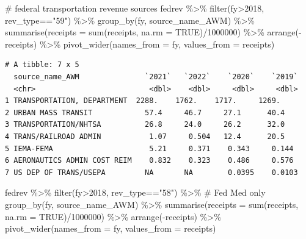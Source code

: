 \documentclass[
  letterpaper,
  DIV=11,
  numbers=noendperiod]{scrreport}
\newenvironment{Shaded}{\begin{snugshade}}{\end{snugshade}}
\newcommand{\AttributeTok}[1]{\textcolor[rgb]{0.40,0.45,0.13}{#1}}
\newcommand{\CommentTok}[1]{\textcolor[rgb]{0.37,0.37,0.37}{#1}}
\newcommand{\ConstantTok}[1]{\textcolor[rgb]{0.56,0.35,0.01}{#1}}
\newcommand{\DecValTok}[1]{\textcolor[rgb]{0.68,0.00,0.00}{#1}}
\newcommand{\FunctionTok}[1]{\textcolor[rgb]{0.28,0.35,0.67}{#1}}
\newcommand{\NormalTok}[1]{\textcolor[rgb]{0.00,0.23,0.31}{#1}}
\newcommand{\SpecialCharTok}[1]{\textcolor[rgb]{0.37,0.37,0.37}{#1}}
\newcommand{\StringTok}[1]{\textcolor[rgb]{0.13,0.47,0.30}{#1}}
\begin{document}
\begin{Shaded}
\begin{Highlighting}[]
\CommentTok{\# federal transportation revenue sources}
\NormalTok{fedrev }\SpecialCharTok{\%\textgreater{}\%} 
  \FunctionTok{filter}\NormalTok{(fy}\SpecialCharTok{\textgreater{}}\DecValTok{2018}\NormalTok{, rev\_type}\SpecialCharTok{==}\StringTok{"59"}\NormalTok{) }\SpecialCharTok{\%\textgreater{}\%}
  \FunctionTok{group\_by}\NormalTok{(fy, source\_name\_AWM) }\SpecialCharTok{\%\textgreater{}\%} 
  \FunctionTok{summarise}\NormalTok{(}\AttributeTok{receipts =} \FunctionTok{sum}\NormalTok{(receipts, }\AttributeTok{na.rm =} \ConstantTok{TRUE}\NormalTok{)}\SpecialCharTok{/}\DecValTok{1000000}\NormalTok{) }\SpecialCharTok{\%\textgreater{}\%}
  \FunctionTok{arrange}\NormalTok{(}\SpecialCharTok{{-}}\NormalTok{receipts) }\SpecialCharTok{\%\textgreater{}\%}
  \FunctionTok{pivot\_wider}\NormalTok{(}\AttributeTok{names\_from =}\NormalTok{ fy, }\AttributeTok{values\_from =}\NormalTok{ receipts)}
\end{Highlighting}
\end{Shaded}

\begin{verbatim}
# A tibble: 7 x 5
  source_name_AWM               `2021`   `2022`    `2020`    `2019`
  <chr>                          <dbl>    <dbl>     <dbl>     <dbl>
1 TRANSPORTATION, DEPARTMENT  2288.    1762.    1717.     1269.    
2 URBAN MASS TRANSIT            57.4     46.7     27.1      40.4   
3 TRANSPORTATION/NHTSA          26.8     24.0     26.2      32.0   
4 TRANS/RAILROAD ADMIN           1.07     0.504   12.4      20.5   
5 IEMA-FEMA                      5.21     0.371    0.343     0.144 
6 AERONAUTICS ADMIN COST REIM    0.832    0.323    0.486     0.576 
7 US DEP OF TRANS/USEPA         NA       NA        0.0395    0.0103
\end{verbatim}

\begin{Shaded}
\begin{Highlighting}[]
\NormalTok{fedrev }\SpecialCharTok{\%\textgreater{}\%} 
  \FunctionTok{filter}\NormalTok{(fy}\SpecialCharTok{\textgreater{}}\DecValTok{2018}\NormalTok{, rev\_type}\SpecialCharTok{==}\StringTok{"58"}\NormalTok{) }\SpecialCharTok{\%\textgreater{}\%} \CommentTok{\# Fed Med only}
  \FunctionTok{group\_by}\NormalTok{(fy, source\_name\_AWM) }\SpecialCharTok{\%\textgreater{}\%} 
  \FunctionTok{summarise}\NormalTok{(}\AttributeTok{receipts =} \FunctionTok{sum}\NormalTok{(receipts, }\AttributeTok{na.rm =} \ConstantTok{TRUE}\NormalTok{)}\SpecialCharTok{/}\DecValTok{1000000}\NormalTok{) }\SpecialCharTok{\%\textgreater{}\%}
  \FunctionTok{arrange}\NormalTok{(}\SpecialCharTok{{-}}\NormalTok{receipts) }\SpecialCharTok{\%\textgreater{}\%}
  \FunctionTok{pivot\_wider}\NormalTok{(}\AttributeTok{names\_from =}\NormalTok{ fy, }\AttributeTok{values\_from =}\NormalTok{ receipts)}
\end{Highlighting}
\end{Shaded}
\end{document}
